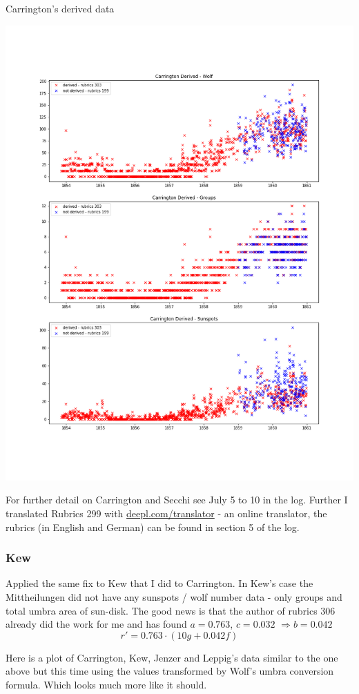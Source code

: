 \documentclass[12pt]{article}
\newcommand{\RA}{\Rightarrow}
\begin{document}
{\centering
    \caption{Carrington's derived data}
    \includegraphics[width=0.9\linewidth]{carrington_derived.png}
    \label{figure:carrington derived}
\par}

For further detail on Carrington and Secchi see July 5 to 10 in the log. Further I translated Rubrics 299 with \href{https://www.deepl.com/translator}{deepl.com/translator} - an online translator, the rubrics (in English and German) can be found in section 5 of the log.

\subsubsection{Kew}

Applied the same fix to Kew that I did to Carrington. In Kew's case the Mittheilungen did not have any sunspots / wolf number data - only groups and total umbra area of sun-disk. The good news is that the author of rubrics 306 already did the work for me and has found $a = 0.763$, $c = 0.032$ $\RA b = 0.042$
$$r' = 0.763 \cdot (10 g + 0.042 f)$$

Here is a plot of Carrington, Kew, Jenzer and Leppig's data similar to the one above but this time using the values transformed by Wolf's umbra conversion formula. Which looks much more like it should.\\
\end{document}
